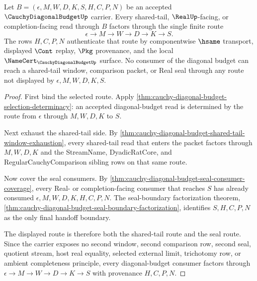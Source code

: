 \begin{theorem}
\label{thm:cauchy-diagonal-budget-route-factorization}
Let $B=(\epsilon,M,W,D,K,S,H,C,P,N)$ be an accepted $\CauchyDiagonalBudgetUp$ carrier. Every shared-tail, $\RealUp$-facing, or completion-facing read through $B$ factors through the single finite route
$$
\epsilon \to M \to W \to D \to K \to S.
$$
The rows $H,C,P,N$ authenticate that route by componentwise $\hsame$ transport, displayed $\Cont$ replay, $\Pkg$ provenance, and the local $\NameCert_{\CauchyDiagonalBudgetUp}$ surface. No consumer of the diagonal budget can reach a shared-tail window, comparison packet, or Real seal through any route not displayed by $\epsilon,M,W,D,K,S$.
\end{theorem}
\begin{proof}
First bind the selected route. Apply \autoref{thm:cauchy-diagonal-budget-selection-determinacy}: an accepted diagonal-budget read is determined by the route from $\epsilon$ through $M,W,D,K$ to $S$.

Next exhaust the shared-tail side. By \autoref{thm:cauchy-diagonal-budget-shared-tail-window-exhaustion}, every shared-tail read that enters the packet factors through $M,W,D,K$ and the StreamName, DyadicRatCore, and RegularCauchyComparison sibling rows on that same route.

Now cover the seal consumers. By \autoref{thm:cauchy-diagonal-budget-seal-consumer-coverage}, every Real- or completion-facing consumer that reaches $S$ has already consumed $\epsilon,M,W,D,K,H,C,P,N$. The seal-boundary factorization theorem, \autoref{thm:cauchy-diagonal-budget-seal-boundary-factorization}, identifies $S,H,C,P,N$ as the only final handoff boundary.

The displayed route is therefore both the shared-tail route and the seal route. Since the carrier exposes no second window, second comparison row, second seal, quotient stream, host real equality, selected external limit, trichotomy row, or ambient completeness principle, every diagonal-budget consumer factors through $\epsilon \to M \to W \to D \to K \to S$ with provenance $H,C,P,N$.
\end{proof}

